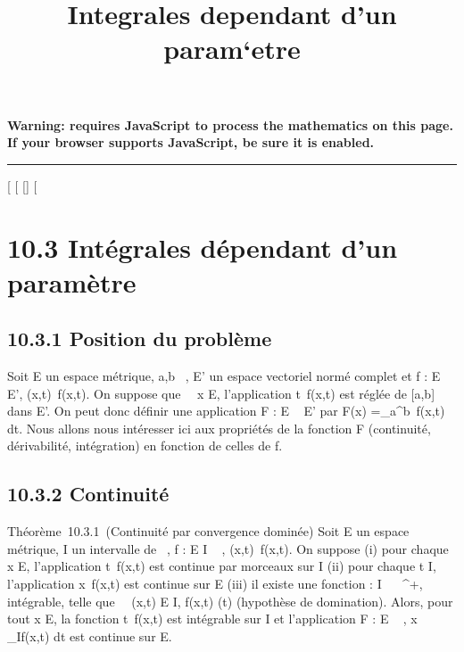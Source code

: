 \documentclass[]{article}
\title{Integrales dependant d'un param`etre}
\author{}
\date{}
\begin{document}
\maketitle

\textbf{Warning: 
requires JavaScript to process the mathematics on this page.\\ If your
browser supports JavaScript, be sure it is enabled.}

\begin{center}\rule{3in}{0.4pt}\end{center}

[
[
[]
[

\section{10.3 Intégrales dépendant d'un paramètre}

\subsection{10.3.1 Position du problème}

Soit E un espace métrique, a,b \in {}~, E' un espace vectoriel normé complet
et f : E \times [a,b] \rightarrow~ E', (x,t)\mapsto~f(x,t). On
suppose que \forall~~x \in E, l'application
t\mapsto~f(x,t) est réglée de [a,b] dans E'. On
peut donc définir une application F : E \rightarrow~ E' par F(x)
=\int  _a^b~f(x,t) dt. Nous allons
nous intéresser ici aux propriétés de la fonction F (continuité,
dérivabilité, intégration) en fonction de celles de f.

\subsection{10.3.2 Continuité}

Théorème~10.3.1~(Continuité par convergence dominée) Soit E un espace
métrique, I un intervalle de ~, f : E \times I \rightarrow~ ,
(x,t)\mapsto~f(x,t). On suppose (i) pour chaque x \in
E, l'application t\mapsto~f(x,t) est continue par
morceaux sur I (ii) pour chaque t \in I, l'application
x\mapsto~f(x,t) est continue sur E (iii) il existe
une fonction \phi : I \rightarrow~ ~^+, intégrable, telle que
\forall~~(x,t) \in E \times I, f(x,t)\leq
\phi(t) (hypothèse de domination). Alors, pour tout x \in E, la fonction
t\mapsto~f(x,t) est intégrable sur I et
l'application F : E \rightarrow~ ,
x\mapsto~\int ~
_If(x,t) dt est continue sur E.
\end{document}
